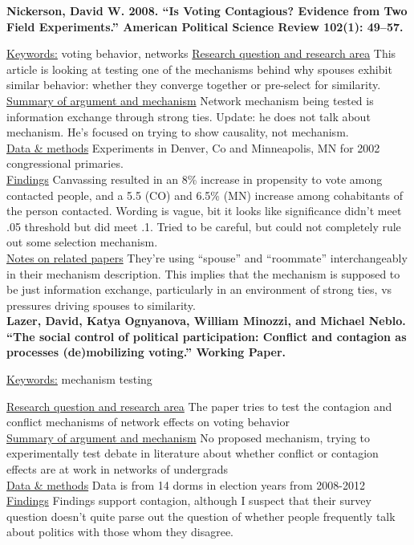 \documentclass{article}[12pt]
\begin{document}
\textbf{Nickerson, David W. 2008. “Is Voting Contagious? Evidence from Two Field Experiments.”
American Political Science Review 102(1): 49–57.}

\underline{Keywords:} voting behavior, networks
\underline{Research question and research area} This article is looking at testing one of the mechanisms behind why spouses exhibit similar behavior: whether they converge together or pre-select for similarity.\\
\underline{Summary of argument and mechanism} Network mechanism being tested is information exchange through strong ties. Update: he does not talk about mechanism. He's focused on trying to show causality, not mechanism.\\
\underline{Data \& methods} Experiments in Denver, Co and Minneapolis, MN for 2002 congressional primaries.\\
\underline{Findings} Canvassing resulted in an 8\% increase in propensity to vote among contacted people, and a 5.5 (CO) and 6.5\% (MN) increase among cohabitants of the person contacted. Wording is vague, bit it looks like significance didn't meet .05 threshold but did meet .1. Tried to be careful, but could not completely rule out some selection mechanism.\\
\underline{Notes on related papers} They're using ``spouse'' and ``roommate'' interchangeably in their mechanism description. This implies that the mechanism is supposed to be just information exchange, particularly in an environment of strong ties, vs pressures driving spouses to similarity.   \\


\textbf{Lazer, David, Katya Ognyanova, William Minozzi, and Michael Neblo. “The social control of
political participation: Conflict and contagion as processes (de)mobilizing voting.” Working Paper.}

\underline{Keywords:} mechanism testing

\underline{Research question and research area} The paper tries to test the contagion and conflict mechanisms of network effects on voting behavior\\
\underline{Summary of argument and mechanism} No proposed mechanism, trying to experimentally test debate in literature about whether conflict or contagion effects are at work in networks of undergrads\\
\underline{Data \& methods} Data is from 14 dorms in election years from 2008-2012\\
\underline{Findings} Findings support contagion, although I suspect that their survey question doesn't quite parse out the question of whether people frequently talk about politics with those whom they disagree. \\
\end{document}
